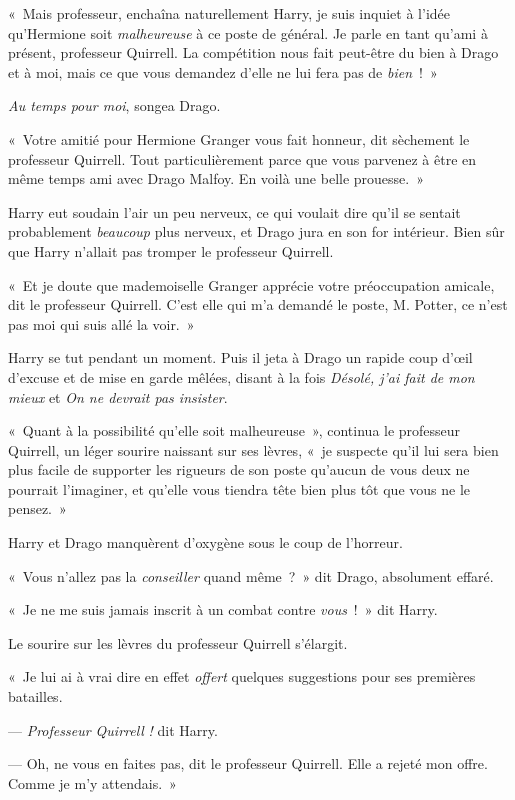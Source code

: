 «~Mais professeur, enchaîna naturellement Harry, je suis inquiet à l'idée qu'Hermione soit \emph{malheureuse} à ce poste de général. Je parle en tant qu'ami à présent, professeur Quirrell. La compétition nous fait peut-être du bien à Drago et à moi, mais ce que vous demandez d'elle ne lui fera pas de \emph{bien}~!~»

\emph{Au temps pour moi}, songea Drago.

«~Votre amitié pour Hermione Granger vous fait honneur, dit sèchement le professeur Quirrell. Tout particulièrement parce que vous parvenez à être en même temps ami avec Drago Malfoy. En voilà une belle prouesse.~»

Harry eut soudain l'air un peu nerveux, ce qui voulait dire qu'il se sentait probablement \emph{beaucoup} plus nerveux, et Drago jura en son for intérieur. Bien sûr que Harry n'allait pas tromper le professeur Quirrell.

«~Et je doute que mademoiselle Granger apprécie votre préoccupation amicale, dit le professeur Quirrell. C'est elle qui m'a demandé le poste, M. Potter, ce n'est pas moi qui suis allé la voir.~»

Harry se tut pendant un moment. Puis il jeta à Drago un rapide coup d'œil d'excuse et de mise en garde mêlées, disant à la fois \emph{Désolé, j'ai fait de mon mieux} et \emph{On ne devrait pas insister}.

«~Quant à la possibilité qu'elle soit malheureuse~», continua le professeur Quirrell, un léger sourire naissant sur ses lèvres, «~je suspecte qu'il lui sera bien plus facile de supporter les rigueurs de son poste qu'aucun de vous deux ne pourrait l'imaginer, et qu'elle vous tiendra tête bien plus tôt que vous ne le pensez.~»

Harry et Drago manquèrent d'oxygène sous le coup de l'horreur.

«~Vous n'allez pas la \emph{conseiller} quand même~?~» dit Drago, absolument effaré.

«~Je ne me suis jamais inscrit à un combat contre \emph{vous}~!~» dit Harry.

Le sourire sur les lèvres du professeur Quirrell s'élargit.

«~Je lui ai à vrai dire en effet \emph{offert} quelques suggestions pour ses premières batailles.

--- \emph{Professeur Quirrell} \emph{!} dit Harry.

--- Oh, ne vous en faites pas, dit le professeur Quirrell. Elle a rejeté mon offre. Comme je m'y attendais.~»

